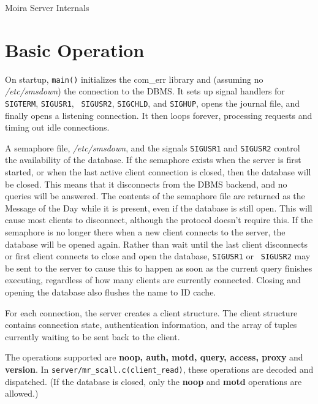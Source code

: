 

\begin{center}
{\Large Moira Server Internals}
\end{center}

\section{Basic Operation}

On startup, {\tt main()} initializes the com\_err library and
(assuming no {\it /etc/smsdown\/}) the connection to the DBMS. It
sets up signal handlers for {\tt SIGTERM}, {\tt SIGUSR1}, {\tt
SIGUSR2}, {\tt SIGCHLD}, and {\tt SIGHUP}, opens the journal file, and
finally opens a listening connection. It then loops forever,
processing requests and timing out idle connections.

A semaphore file, {\it /etc/smsdown}, and the signals {\tt SIGUSR1}
and {\tt SIGUSR2} control the availability of the database. If the
semaphore exists when the server is first started, or when the last
active client connection is closed, then the database will be closed.
This means that it disconnects from the DBMS backend, and no queries
will be answered. The contents of the semaphore file are returned as
the Message of the Day while it is present, even if the database is
still open. This will cause most clients to disconnect, although the
protocol doesn't require this. If the semaphore is no longer there
when a new client connects to the server, the database will be opened
again. Rather than wait until the last client disconnects or first
client connects to close and open the database, {\tt SIGUSR1} or {\tt
SIGUSR2} may be sent to the server to cause this to happen as soon as
the current query finishes executing, regardless of how many clients
are currently connected. Closing and opening the database also flushes
the name to ID cache.

For each connection, the server creates a client structure. The client
structure contains connection state, authentication information, and
the array of tuples currently waiting to be sent back to the client.

The operations supported are {\bf noop, auth, motd, query, access,
proxy} and {\bf version}. In {\tt server/mr\_scall.c(client\_read)},
these operations are decoded and dispatched. (If the database is
closed, only the {\bf noop} and {\bf motd} operations are allowed.)

